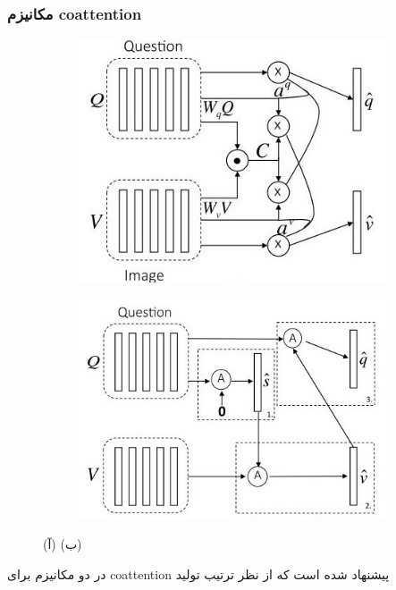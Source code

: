 {{		\subsubsection{مکانیزم coattention}
		{
			\begin{figure}
				\centering
				\begin{subfigure}[b]{0.4\textwidth}
					\centering
					\includegraphics[width=0.85\linewidth]{images/parallel.JPG}
					\caption{}
				\end{subfigure}%
				\begin{subfigure}[b]{0.42\textwidth}
					\centering
					\includegraphics[width=0.85\linewidth]{images/alternating.JPG}
					\caption{}
				\end{subfigure}%
				\caption
				{
					(آ) 
					(ب)
				}
				\label{fig:5}
			\end{figure}
			در 
			\cite{}
			 دو مکانیزم برای coattention پیشنهاد شده است که از نظر ترتیب تولید 
}}}
